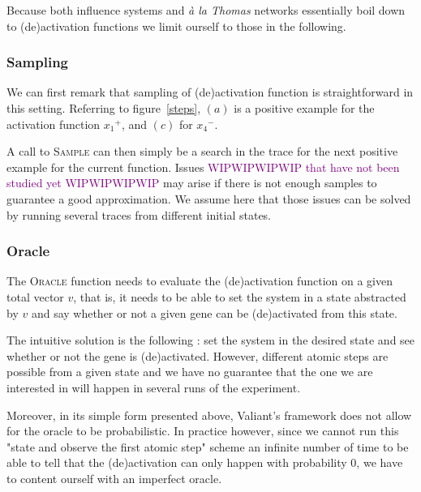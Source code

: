 \documentclass{llncs}
\newcommand{\wip}[1]{\textcolor{Purple}{WIPWIPWIPWIP #1 WIPWIPWIPWIP}}
\begin{document}
Because both influence systems and \textit{\`{a} la Thomas} networks essentially boil down to (de)activation functions we limit ourself to those in the following.

\subsubsection{Sampling}

We can first remark that sampling of (de)activation function is straightforward in this setting. Referring to figure~\ref{steps}, $(a)$ is a positive example for the activation function ${x_1}^+$, and $(c)$ for ${x_4}^-$.

A call to \textsc{Sample} can then simply be a search in the trace for the next positive example for the current function. Issues \wip{that have not been studied yet} may arise if there is not enough samples to guarantee a good approximation. 
We assume here that those issues can be solved by running several traces from different initial states.

\subsubsection{Oracle}
The \textsc{Oracle} function needs to evaluate the (de)activation function on a given total vector $v$, that is, it needs to be able to set the system in a state abstracted by $v$ and say whether or not a given gene can be (de)activated from this state.

The intuitive solution is the following : set the system in the desired state and see whether or not the gene is (de)activated. 
However, different atomic steps are possible from a given state and we have no guarantee that the one we are interested in will happen
in several runs of the experiment. 

Moreover, in its simple form presented above, %
Valiant's framework does not allow for the oracle to be probabilistic.
In practice however, since we cannot run this "state and observe the first atomic step" scheme an infinite number of time to be able to tell that the (de)activation can only happen with probability 0,
we have to content ourself with an imperfect oracle.
\end{document}
